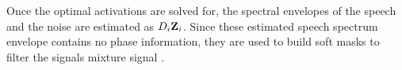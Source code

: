 Once the optimal activations are solved for, the spectral envelopes of the speech and the noise are 
estimated as $ {D}_{i} \bm{\mathrm{Z}}_{i}$. Since these estimated speech spectrum envelope contains no phase information, 
they are used to build soft masks to filter the signals mixture signal \cite{schmidt07mlsp}.


%
%
